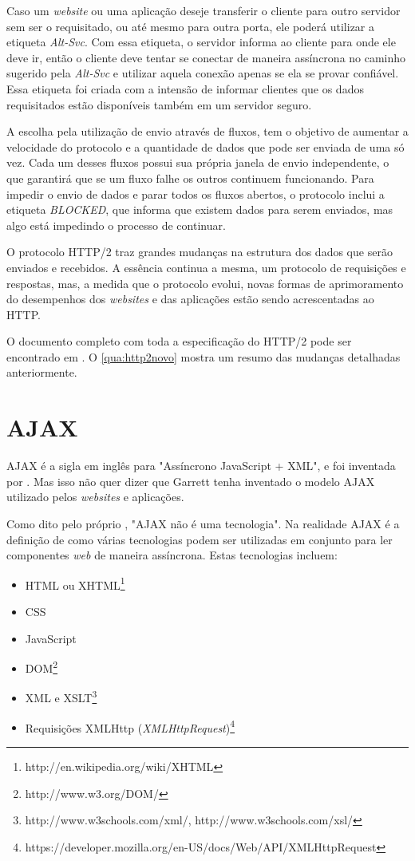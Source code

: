 Caso um \textit{website} ou uma aplicação deseje transferir o cliente para outro servidor sem ser o requisitado, ou até mesmo para outra porta, ele poderá utilizar a etiqueta \textit{Alt-Svc}. Com essa etiqueta, o servidor informa ao cliente para onde ele deve ir, então o cliente deve tentar se conectar de maneira assíncrona no caminho sugerido pela \textit{Alt-Svc} e utilizar aquela conexão apenas se ela se provar confiável. Essa etiqueta foi criada com a intensão de informar clientes que os dados requisitados estão disponíveis também em um servidor seguro.

A escolha pela utilização de envio através de fluxos, tem o objetivo de aumentar a velocidade do protocolo e a quantidade de dados que pode ser enviada de uma só vez. Cada um desses fluxos possui sua própria janela de envio independente, o que garantirá que se um fluxo falhe os outros continuem funcionando. Para impedir o envio de dados e parar todos os fluxos abertos, o protocolo inclui a etiqueta \textit{BLOCKED}, que informa que existem dados para serem enviados, mas algo está impedindo o processo de continuar.

O protocolo HTTP/2 traz grandes mudanças na estrutura dos dados que serão enviados e recebidos. A essência continua a mesma, um protocolo de requisições e respostas, mas, a medida que o protocolo evolui, novas formas de aprimoramento do desempenhos dos \textit{websites} e das aplicações estão sendo acrescentadas ao HTTP.

O documento completo com toda a especificação do HTTP/2 pode ser encontrado em . O \autoref{qua:http2novo} mostra um resumo das mudanças detalhadas anteriormente.



\newpage
\section{AJAX}
\label{sec:ajax}
AJAX é a sigla em inglês para "Assíncrono JavaScript + XML", e foi inventada por . Mas isso não quer dizer que Garrett tenha inventado o modelo AJAX utilizado pelos \textit{websites} e aplicações.

Como dito pelo próprio , "AJAX não é uma tecnologia". Na realidade AJAX é a definição de como várias tecnologias podem ser utilizadas em conjunto para ler componentes \textit{web} de maneira assíncrona. Estas tecnologias incluem:
	\begin{itemize}
		\item HTML ou XHTML\footnote{http://en.wikipedia.org/wiki/XHTML}
		\item CSS
		\item JavaScript
		\item DOM\footnote{http://www.w3.org/DOM/}
		\item XML e XSLT\footnote{http://www.w3schools.com/xml/, http://www.w3schools.com/xsl/}
		\item Requisições XMLHttp (\textit{XMLHttpRequest})\footnote{https://developer.mozilla.org/en-US/docs/Web/API/XMLHttpRequest}
	\end{itemize}


